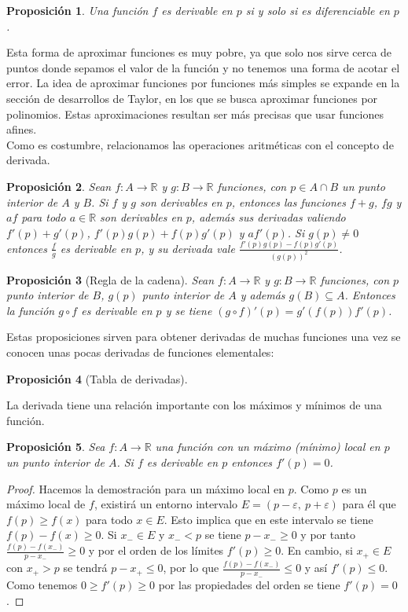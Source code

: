 \documentclass{article}
\newtheorem{prop}{Proposición}
\newcommand{\reales}{\mathbb{R}}
\begin{document}
\begin{prop}
	Una función $f$ es derivable en $p$ si y solo si es diferenciable en $p$.
\end{prop}

Esta forma de aproximar funciones es muy pobre, ya que solo nos sirve cerca de puntos donde sepamos el valor de la función y no tenemos una forma de acotar el error.
La idea de aproximar funciones por funciones más simples se expande en la sección de desarrollos de Taylor, en los que se busca aproximar funciones por polinomios. Estas aproximaciones resultan ser más precisas que usar funciones afines.\\ 
Como es costumbre, relacionamos las operaciones aritméticas con el concepto de derivada.

\begin{prop}
	Sean $f: A \rightarrow \reales$ y $g: B \rightarrow \reales$ funciones, con $p \in A \cap B$ un punto interior de $A$ y $B$. Si $f$ y $g$ son derivables en $p$, entonces las funciones $f + g$, $fg$ y $af$ para todo $a \in \reales$ son derivables en $p$, además sus derivadas valiendo $f'(p) + g'(p)$, $f'(p)g(p) + f(p)g'(p)$ y $af'(p)$. Si $g(p) \neq 0$ entonces $\frac{f}{g}$ es derivable en $p$, y su derivada vale $\frac{f'(p)g(p) - f(p)g'(p)}{(g(p))^2}$.
\end{prop}

\begin{prop}[Regla de la cadena]
	Sean $f: A \rightarrow \reales$ y $g: B \rightarrow \reales$ funciones, con $p$ punto interior de $B$, $g(p)$ punto interior de $A$ y además $g(B) \subseteq A$. Entonces la función $g \circ f$ es derivable en $p$ y se tiene $(g \circ f)'(p) = g'(f(p))f'(p)$.
\end{prop} 

Estas proposiciones sirven para obtener derivadas de muchas funciones una vez se conocen unas pocas derivadas de funciones elementales:
\begin{prop}[Tabla de derivadas]

\end{prop}
La derivada tiene una relación importante con los máximos y mínimos de una función.

\begin{prop}
	Sea $f: A \rightarrow \reales$ una función con un máximo (mínimo) local en $p$ un punto interior de $A$. Si $f$ es derivable en $p$ entonces $f'(p) = 0$.
\end{prop}
\begin{proof}
	Hacemos la demostración para un máximo local en $p$. Como $p$ es un máximo local de $f$, existirá un entorno intervalo $E=(p-\varepsilon,\ p+\varepsilon)$ para él que $f(p) \geq f(x)$ para todo $x \in E$. Esto implica que en este intervalo se tiene $f(p) - f(x) \geq 0$. Si $x_{-} \in E$ y $x_{-} < p$ se tiene $p - x_{-} \geq 0$ y por tanto $\frac{f(p) - f(x_{-})}{p - x_{-}} \geq 0$ y por el orden de los límites $f'(p) \geq 0$. En cambio, si $x_{+} \in E$ con $x_{+} > p$ se tendrá $p - x_{+} \leq 0$, por lo que $\frac{f(p) - f(x_{-})}{p - x_{-}} \leq 0$ y así $f'(p) \leq 0$. Como tenemos $0 \geq f'(p) \geq 0$ por las propiedades del orden se tiene $f'(p) = 0$.
\end{proof}
\end{document}

